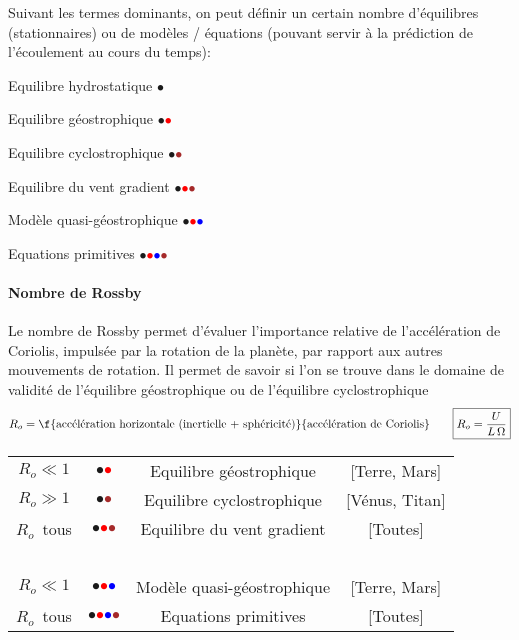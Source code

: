 \sk
Suivant les termes dominants, on peut définir un certain nombre d'équilibres (stationnaires) ou de modèles / équations (pouvant servir à la prédiction de l'écoulement au cours du temps):
\begin{description}
\item{Equilibre hydrostatique} \textcolor{green!75!black}{$\bullet$} 
\item{Equilibre g\'eostrophique} \textcolor{green!75!black}{$\bullet$}\textcolor{red}{$\bullet$}
\item{Equilibre cyclostrophique} \textcolor{green!75!black}{$\bullet$}\textcolor{brown}{$\bullet$}
\item{Equilibre du vent gradient} \textcolor{green!75!black}{$\bullet$}\textcolor{red}{$\bullet$}\textcolor{brown}{$\bullet$}
\item{Modèle quasi-g\'eostrophique} \textcolor{green!75!black}{$\bullet$}\textcolor{red}{$\bullet$}\textcolor{blue}{$\bullet$}
\item{Equations primitives} \textcolor{green!75!black}{$\bullet$}\textcolor{red}{$\bullet$}\textcolor{blue}{$\bullet$}\textcolor{brown}{$\bullet$}
\end{description}

\mk
\paragraph{Nombre de Rossby} Le nombre de Rossby permet d'évaluer l'importance relative de l'accélération de Coriolis, impulsée par la rotation de la planète, par rapport aux autres mouvements de rotation. Il permet de savoir si l'on se trouve dans le domaine de validité de l'équilibre géostrophique ou de l'équilibre cyclostrophique
\[
R_o=\f{\text{accélération horizontale (inertielle + sphéricité)}}{\text{accélération de Coriolis}}\qquad\boxed{R_o=\frac{U}{L\,\Omega}}
\]
\begin{table}[h!]
\begin{tabular}{cccc}
$R_o \ll 1$ & \textcolor{green!75!black}{$\bullet$}\textcolor{red}{$\bullet$} & Equilibre g\'eostrophique & [Terre, Mars]\\
$R_o \gg 1$ & \textcolor{green!75!black}{$\bullet$}\textcolor{brown}{$\bullet$} & Equilibre cyclostrophique & [Vénus, Titan]\\
$R_o$~tous & \textcolor{green!75!black}{$\bullet$}\textcolor{red}{$\bullet$}\textcolor{brown}{$\bullet$} & Equilibre du vent gradient & [Toutes]\\
~ & & & \\
$R_o \ll 1$ & \textcolor{green!75!black}{$\bullet$}\textcolor{red}{$\bullet$}\textcolor{blue}{$\bullet$} & Modèle quasi-g\'eostrophique & [Terre, Mars]\\
$R_o$~tous & \textcolor{green!75!black}{$\bullet$}\textcolor{red}{$\bullet$}\textcolor{blue}{$\bullet$}\textcolor{brown}{$\bullet$} & Equations primitives  & [Toutes]
\end{tabular}
\end{table}

